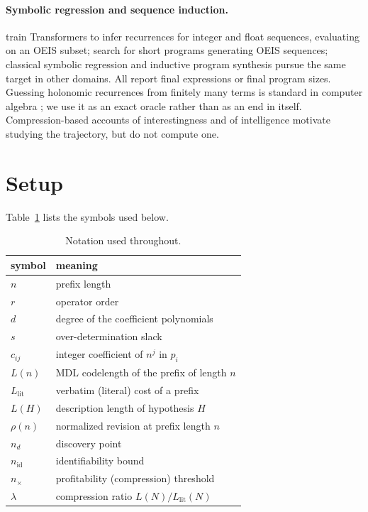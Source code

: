 \documentclass[10pt]{article}
\theoremstyle{definition}
\theoremstyle{plain}
\newcommand{\Llit}{L_{\mathrm{lit}}}
\newcommand{\nid}{n_{\mathrm{id}}}
\newcommand{\nx}{n_{\times}}
\newcommand{\nd}{n_{d}}
\begin{document}
\paragraph{Symbolic regression and sequence induction.} \citet{dascoli2022}
train Transformers to infer recurrences for integer and float sequences,
evaluating on an OEIS subset; \citet{gauthier2023} search for short programs
generating OEIS sequences; classical symbolic regression
\citep{schmidt2009,udrescu2020,cranmer2023} and inductive program synthesis
\citep{ellis2021} pursue the same target in other domains. All report final
expressions or final program sizes. Guessing holonomic recurrences from
finitely many terms is standard in computer algebra
\citep{salvy1994,kauers2009,kauers2015}; we use it as an exact oracle rather
than as an end in itself. Compression-based accounts of interestingness
\citep{schmidhuber2009} and of intelligence \citep{chollet2019} motivate
studying the trajectory, but do not compute one.

\section{Setup}

Table~\ref{tab:notation} lists the symbols used below.

\begin{table}[t]
\centering
\small
\begin{tabular}{ll}
\toprule
symbol & meaning \\
\midrule
$n$ & prefix length \\
$r$ & operator order \\
$d$ & degree of the coefficient polynomials \\
$s$ & over-determination slack \\
$c_{ij}$ & integer coefficient of $n^j$ in $p_i$ \\
$L(n)$ & MDL codelength of the prefix of length $n$ \\
$\Llit$ & verbatim (literal) cost of a prefix \\
$L(H)$ & description length of hypothesis $H$ \\
$\rho(n)$ & normalized revision at prefix length $n$ \\
$\nd$ & discovery point \\
$\nid$ & identifiability bound \\
$\nx$ & profitability (compression) threshold \\
$\lambda$ & compression ratio $L(N)/\Llit(N)$ \\
\bottomrule
\end{tabular}
\caption{Notation used throughout.}
\label{tab:notation}
\end{table}
\end{document}
